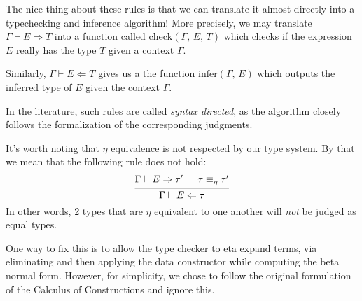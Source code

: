 \documentclass{article}
\begin{document}
The nice thing about these rules is that we can translate it almost directly
into a typechecking and inference algorithm!
More precisely, we may translate $\Gamma \vdash E \Rightarrow T$ into a
function called $\text{check}(\Gamma, \, E, \, T)$ which checks if the
expression $E$ really has the type $T$ given a context $\Gamma$.

Similarly, $\Gamma \vdash E \Leftarrow T$ gives us a the function
$\text{infer}(\Gamma, \, E)$ which outputs the inferred type of $E$ given
the context $\Gamma$.

In the literature, such rules are called \textit{syntax directed}, as the
algorithm closely follows the formalization of the corresponding judgments.

It's worth noting that $\eta$ equivalence is not respected by our type system.
By that we mean that the following rule does not hold:
\[
  \begin{prooftree}
    \hypo{\Gamma \vdash E \Rightarrow \tau'}
    \hypo{\tau \equiv_{\eta} \tau'}
    \infer2{\Gamma \vdash E \Leftarrow \tau}
 \end{prooftree}
\]
In other words, 2 types that are $\eta$ equivalent to one another will 
\textit{not} be judged as equal types.

One way to fix this is to allow the type checker to eta expand terms, via
eliminating and then applying the data constructor while computing the beta
normal form. However, for simplicity, we chose to follow the original 
formulation of the Calculus of Constructions and ignore this.



\end{document}
